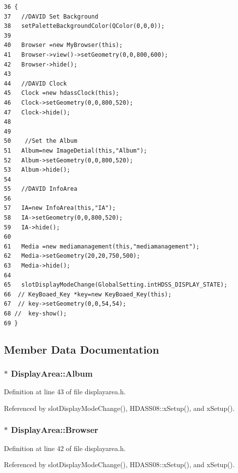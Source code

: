 \footnotesize\begin{verbatim}36 {
37   //DAVID Set Background   
38   setPaletteBackgroundColor(QColor(0,0,0));
39    
40   Browser =new MyBrowser(this);
41   Browser->view()->setGeometry(0,0,800,600);
42   Browser->hide();
43   
44   //DAVID Clock  
45   Clock =new hdassClock(this);
46   Clock->setGeometry(0,0,800,520);
47   Clock->hide();
48   
49   
50    //Set the Album
51   Album=new ImageDetial(this,"Album");
52   Album->setGeometry(0,0,800,520);
53   Album->hide();
54   
55   //DAVID InfoArea
56   
57   IA=new InfoArea(this,"IA");
58   IA->setGeometry(0,0,800,520);
59   IA->hide();
60   
61   Media =new mediamanagement(this,"mediamanagement");
62   Media->setGeometry(20,20,750,500);
63   Media->hide();
64     
65   slotDisplayModeChange(GlobalSetting.intHDSS_DISPLAY_STATE);
66  // KeyBoaed_Key *key=new KeyBoaed_Key(this);
67  // key->setGeometry(0,0,54,54);
68 //  key-show();
69 }
\end{verbatim}\normalsize 


\subsection{Member Data Documentation}
\subsubsection{$\ast$ {\bf Display\-Area::Album}}\label{classDisplayArea_DisplayAreao2}




Definition at line 43 of file displayarea.h.

Referenced by slot\-Display\-Mode\-Change(), HDASS08::x\-Setup(), and x\-Setup().
\subsubsection{$\ast$ {\bf Display\-Area::Browser}}\label{classDisplayArea_DisplayAreao1}




Definition at line 42 of file displayarea.h.

Referenced by slot\-Display\-Mode\-Change(), HDASS08::x\-Setup(), and x\-Setup().

